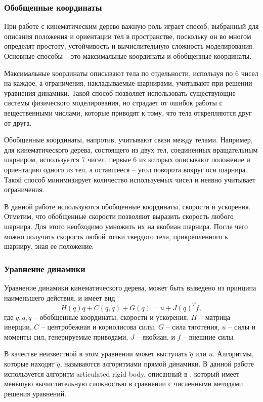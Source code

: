 \subsubsection{Обобщенные координаты}

При работе с кинематическим дерево важную роль играет способ, выбранный для описания положения и ориентации тел в пространстве, поскольку он во многом определят простоту, устойчивость и вычислительную сложность моделирования. Основные способы -- это максимальные координаты и обобщенные координаты.

Максимальные координаты описывают тела по отдельности, используя по 6 чисел на каждое, а ограничения, накладываемые шарнирами, учитывают при решении уравнения динамики. Такой способ позволяет использовать существующие системы физического моделирования, но страдает от ошибок работы с вещественными числами, которые приводят к тому, что тела открепляются друг от друга.

Обобщенные координаты, напротив, учитывают связи между телами. Например, для кинематического дерева, состоящего из двух тел, соединенных вращательным шарниром, используется 7 чисел, первые 6 из которых описывают положение и ориентацию одного из тел, а оставшееся -- угол поворота вокруг оси шарнира. Такой способ минимизирует количество используемых чисел и неявно учитывает ограничения.

В данной работе используются обобщенные координаты, скорости и ускорения. Отметим, что обобщенные скорости позволяют выразить скорость любого шарнира. Для этого необходимо умножить их на якобиан шарнира. После чего можно получить скорость любой точки твердого тела, прикрепленного к шарниру, зная ее положение.

\subsubsection{Уравнение динамики}

Уравнение динамики кинематического дерева, может быть выведено из принципа наименьшего действия, и имеет вид
\begin{equation}
  H(q) \ddot{q} + C(q, \dot{q}) + G(q) = u + J(q)^{T} f,
\end{equation}
где $q, \dot{q}, \ddot{q}$ -- обобщенные координаты, скорости и ускорения, $H$ -- матрица инерции, $C$ -- центробежная и кориолисова силы, $G$ -- сила тяготения, $u$ -- силы и моменты сил, генерируемые приводами, $J$ -- якобиан, и $f$ -- внешние силы.

В качестве неизвестной в этом уравнении может выступать $\ddot{q}$ или $u$. Алгоритмы, которые находят $\ddot{q}$, называются алгоритмами прямой динамики. В данной работе используется алгоритм articulated rigid body, описанный в \cite{Featherstone}, который имеет меньшую вычислительную сложностью в сравнении с численными методами решения уравнений.

